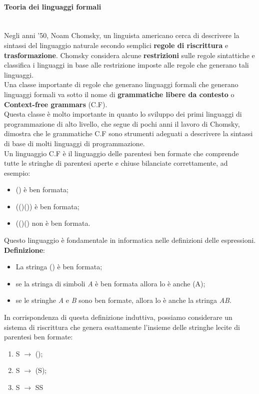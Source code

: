 \documentclass[12pt]{report}
\begin{document}
	\paragraph{Teoria dei linguaggi formali} \quad \\
	Negli anni '50, Noam Chomsky, un linguista americano cerca di descrivere la sintassi del linguaggio naturale secondo semplici \textbf{regole di riscrittura} e \textbf{trasformazione}. Chomsky considera alcune \textbf{restrizioni} sulle regole sintattiche e classifica i linguaggi in base alle restrizione imposte alle regole che generano tali linguaggi. \\
	Una classe importante di regole che generano linguaggi formali che generano linguaggi formali va sotto il nome di \textbf{grammatiche libere da contesto} o \textbf{Context-free grammars} (C.F). \\
	Questa classe è molto importante in quanto lo sviluppo dei primi linguaggi di programmazione di alto livello, che segue di pochi anni il lavoro di Chomsky, dimostra che le grammatiche C.F sono strumenti adeguati a descrivere la sintassi di base di molti linguaggi di programmazione. \\
	Un linguaggio C.F è il linguaggio delle parentesi ben formate che comprende tutte le stringhe di parentesi aperte e chiuse bilanciate correttamente, ad esempio:
	\begin{itemize}
		\item () è ben formata;
		\item (()()) è ben formata;
		\item (()() non è ben formata.
	\end{itemize}
	Questo linguaggio è fondamentale in informatica nelle definizioni delle espressioni. \\
	\textbf{Definizione}:
	\begin{itemize}
		\item La stringa () è ben formata;
		\item se la stringa di simboli \textit{A} è ben formata allora lo è anche (A);
		\item se le stringhe \textit{A} e \textit{B} sono ben formate, allora lo è anche la stringa \textit{AB}.
	\end{itemize}
	In corrispondenza di questa definizione induttiva, possiamo considerare un sistema di riscrittura che genera esattamente l'insieme delle stringhe lecite di parentesi ben formate:
	\begin{enumerate}
		\item S $\to$ ();
		\item S $\to$ (S);
		\item S $\to$ SS
	\end{enumerate}
\end{document}
